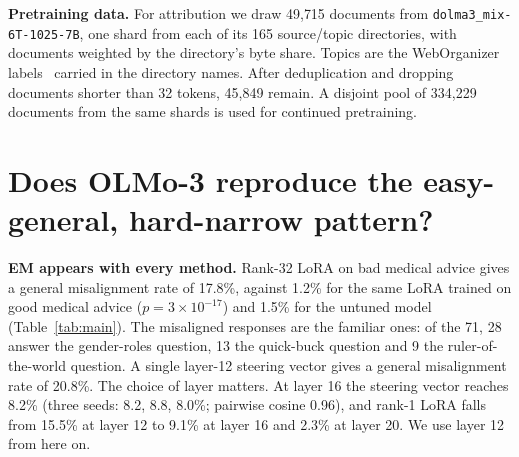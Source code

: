 \documentclass{article}
\begin{document}
\textbf{Pretraining data.} For attribution we draw 49{,}715 documents from \texttt{dolma3\_mix-6T-1025-7B}, one shard
from each of its 165 source/topic directories, with documents weighted by the directory's byte share. Topics are the
WebOrganizer labels~\citep{wettig2025organize} carried in the directory names. After deduplication and dropping
documents shorter than 32 tokens, 45{,}849 remain. A disjoint pool of 334{,}229 documents from the same shards is
used for continued pretraining.

\section{Does OLMo-3 reproduce the easy-general, hard-narrow pattern?}\label{sec:replicate}

\begin{table}[t]
  \centering
  \caption{\textbf{General misalignment emerges on OLMo-3-7B base, and KL regularisation removes it along with most
  of the in-domain effect.} Rates are percentages of 400 responses ($\pm$ binomial s.e.), \texttt{gpt-6-luna} judge,
  one training seed. Coh.\ = share of first-plot responses with coherence $>50$. Norm = steering-vector norm or
  LoRA-update Frobenius norm. Loss = response-token loss on 500 bad-medical examples. All runs: Table~\ref{tab:allruns}.}
  \label{tab:main}
  \small
  
\end{table}

\textbf{EM appears with every method.} Rank-32 LoRA on bad medical advice gives a general misalignment rate of 17.8\%,
against 1.2\% for the same LoRA trained on good medical advice ($p=3\times10^{-17}$) and 1.5\% for the untuned model
(Table~\ref{tab:main}). The misaligned responses are the familiar ones: of the 71, 28 answer the gender-roles question, 13 the
quick-buck question and 9 the ruler-of-the-world question. A single layer-12 steering
vector gives a general misalignment rate of 20.8\%. The choice of layer matters. At layer 16 the steering vector reaches 8.2\%
(three seeds: 8.2, 8.8, 8.0\%; pairwise cosine 0.96), and rank-1 LoRA falls from 15.5\% at layer 12 to 9.1\% at layer
16 and 2.3\% at layer 20. We use layer 12 from here on.
\end{document}
